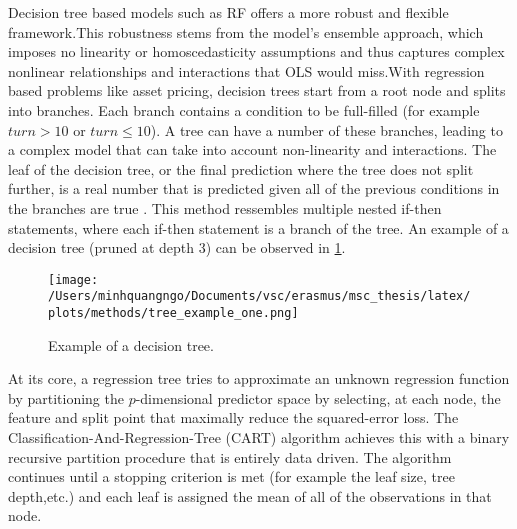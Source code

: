 Decision tree based models such as RF offers a more robust and flexible framework.This robustness stems from the model's ensemble approach, which imposes no linearity or homoscedasticity assumptions and thus captures complex nonlinear relationships and interactions that OLS would miss.With regression based problems like asset pricing, decision trees start from a root node and splits into branches. Each branch contains a condition to be full-filled (for example $turn > 10$ or $turn \leq 10$). A tree can have a number of these branches, leading to a complex model that can take into account non-linearity and interactions. The leaf of the decision tree, or the final prediction where the tree does not split further, is a real number that is predicted given all of the previous conditions in the branches are true \cite{cutler_2012}. This method ressembles multiple nested if-then statements, where each if-then statement is a branch of the tree. An example of a decision tree (pruned at depth 3) can be observed in \cref{fig:decision_tree_viz}.

\begin{figure}[H]
    \centering
    \texttt{[image: /Users/minhquangngo/Documents/vsc/erasmus/msc\_thesis/latex/plots/methods/tree\_example\_one.png]}
    \caption{Example of a decision tree.}
    \label{fig:decision_tree_viz}
\end{figure}

At its core, a regression tree tries to approximate an unknown regression function by partitioning the $p$-dimensional predictor space  by selecting, at each node, the feature and split point that maximally reduce the squared-error loss. The Classification-And-Regression-Tree (CART) algorithm achieves this with a binary recursive partition procedure that is entirely data driven. The algorithm continues until a stopping criterion is met (for example the leaf size, tree depth,etc.) and each leaf is assigned the mean of all of the observations in that node.

